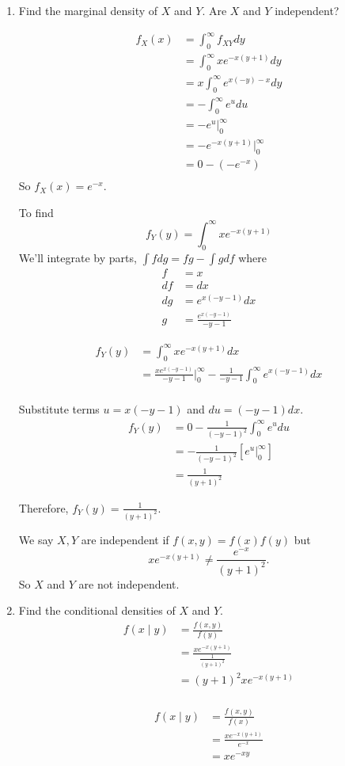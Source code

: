 \documentclass{tufte-book}
\theoremstyle{mytheoremstyle}
\theoremstyle{mylemstyle}
\theoremstyle{mydefstyle}
\begin{document}
\begin{enumerate}

\item Find the marginal density of $X$ and $Y$.  Are $X$ and $Y$ independent?

\begin{align*}
f_X(x) &= \int_0^\infty f_{XY}dy\\
&= \int_0^\infty xe^{-x(y+1)}dy\\
&= x\int_0^\infty e^{x(-y)-x}dy\\
&= -\int_0^\infty e^udu\\
&= -e^u\Big|_0^\infty\\
&= -e^{-x(y+1)}\Big|_0^\infty\\
&= 0-(-e^{-x})\\
\end{align*}
So $f_X(x) = e^{-x}$.

To find
\[ f_Y(y) = \int_0^\infty xe^{-x(y+1)} \]
We'll integrate by parts, $\int fdg = fg -\int gdf$ where
\begin{align*}
f &=x\\
df &=dx\\
dg &= e^{x(-y-1)}dx\\
g &=\frac{e^{x(-y-1)}}{-y-1}
\end{align*}

\begin{align*}
f_Y(y)&=\int_0^\infty xe^{-x(y+1)}dx\\
&= \frac{xe^{x(-y-1)}}{-y-1}\Big|_0^\infty-\frac{1}{-y-1}\int_0^\infty e^{x(-y-1)}dx\\
\end{align*}

Substitute terms $u=x(-y-1)$ and $du=(-y-1)dx$.
\begin{align*}
f_Y(y)&= 0-\frac{1}{(-y-1)^2}\int_0^\infty e^{u}du\\
&=-\frac{1}{(-y-1)^2}[e^{u}\Big|_0^\infty]\\
&=\frac{1}{(y+1)^2}
\end{align*}

Therefore, $f_Y(y)=\frac{1}{(y+1)^2}$.

We say $X,Y$ are independent if $f(x,y)=f(x)f(y)$ but
\[ xe^{-x(y+1)}\neq \frac{e^{-x}}{(y+1)^2}. \]
So $X$ and $Y$ are not independent.

\item Find the conditional densities of $X$ and $Y$.
\begin{align*}
f(x\mid y) &= \frac{f(x,y)}{f(y)}\\
&= \frac{xe^{-x(y+1)}}{\frac{1}{(y+1)^2}}\\
&= (y+1)^2xe^{-x(y+1)}\\
\end{align*}

\begin{align*}
f(x\mid y) &= \frac{f(x,y)}{f(x)}\\
&= \frac{xe^{-x(y+1)}}{e^{-x}}\\
&= xe^{-xy}
\end{align*}
\end{enumerate}
\end{document}
